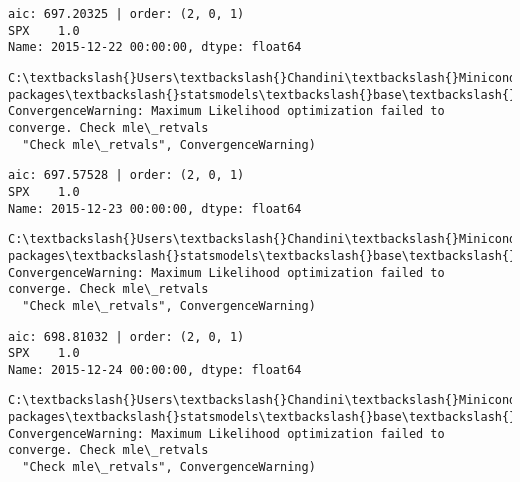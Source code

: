 \documentclass[11pt]{article}
\begin{document}
    \begin{Verbatim}[commandchars=\\\{\}]
aic: 697.20325 | order: (2, 0, 1)
SPX    1.0
Name: 2015-12-22 00:00:00, dtype: float64

    \end{Verbatim}

    \begin{Verbatim}[commandchars=\\\{\}]
C:\textbackslash{}Users\textbackslash{}Chandini\textbackslash{}Miniconda3\textbackslash{}envs\textbackslash{}auquan\textbackslash{}lib\textbackslash{}site-packages\textbackslash{}statsmodels\textbackslash{}base\textbackslash{}model.py:496: ConvergenceWarning: Maximum Likelihood optimization failed to converge. Check mle\_retvals
  "Check mle\_retvals", ConvergenceWarning)

    \end{Verbatim}

    \begin{Verbatim}[commandchars=\\\{\}]
aic: 697.57528 | order: (2, 0, 1)
SPX    1.0
Name: 2015-12-23 00:00:00, dtype: float64

    \end{Verbatim}

    \begin{Verbatim}[commandchars=\\\{\}]
C:\textbackslash{}Users\textbackslash{}Chandini\textbackslash{}Miniconda3\textbackslash{}envs\textbackslash{}auquan\textbackslash{}lib\textbackslash{}site-packages\textbackslash{}statsmodels\textbackslash{}base\textbackslash{}model.py:496: ConvergenceWarning: Maximum Likelihood optimization failed to converge. Check mle\_retvals
  "Check mle\_retvals", ConvergenceWarning)

    \end{Verbatim}

    \begin{Verbatim}[commandchars=\\\{\}]
aic: 698.81032 | order: (2, 0, 1)
SPX    1.0
Name: 2015-12-24 00:00:00, dtype: float64

    \end{Verbatim}

    \begin{Verbatim}[commandchars=\\\{\}]
C:\textbackslash{}Users\textbackslash{}Chandini\textbackslash{}Miniconda3\textbackslash{}envs\textbackslash{}auquan\textbackslash{}lib\textbackslash{}site-packages\textbackslash{}statsmodels\textbackslash{}base\textbackslash{}model.py:496: ConvergenceWarning: Maximum Likelihood optimization failed to converge. Check mle\_retvals
  "Check mle\_retvals", ConvergenceWarning)

    \end{Verbatim}
\end{document}
